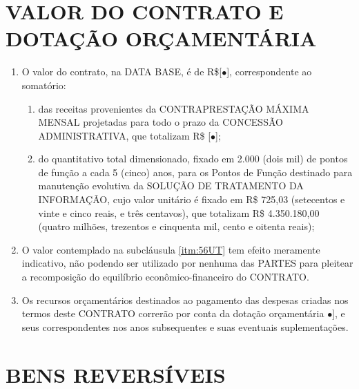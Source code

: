 \documentclass[a4paper,11pt]{report} %
\newcommand{\ValorContrato}{[$\bullet$]}
\newcommand{\ValorTotalCP}{[$\bullet$]}
\newcommand{\DotacaoOrcamentaria}{$\bullet$]}
\begin{document}
\section{VALOR DO CONTRATO E DOTAÇÃO ORÇAMENTÁRIA}
\label{sec:5GLW}

\begin{enumerate}
\item \label{itm:56UT} O valor do contrato, na DATA BASE, é de R\$\ValorContrato, correspondente ao somatório: 

\begin{enumerate}[label*=\arabic*.]
\item \label{itm:3887}	das receitas provenientes da CONTRAPRESTAÇÃO MÁXIMA MENSAL projetadas para todo o prazo da CONCESSÃO ADMINISTRATIVA, que totalizam R\$ \ValorTotalCP;
\item \label{itm:9XEH}	do quantitativo total dimensionado, fixado em 2.000 (dois mil) de pontos de função a cada 5 (cinco) anos, para os Pontos de Função destinado para manutenção evolutiva da SOLUÇÃO DE TRATAMENTO DA INFORMAÇÃO, cujo valor unitário é fixado em R\$ 725,03 (setecentos e vinte e cinco reais, e três centavos), que totalizam R\$ 4.350.180,00 (quatro milhões, trezentos e cinquenta mil, cento e oitenta reais);
\end{enumerate}

\item \label{itm:7ARJ} O valor contemplado na subcláusula \ref{itm:56UT} tem efeito meramente indicativo, não podendo ser utilizado por nenhuma das PARTES para pleitear a recomposição do equilíbrio econômico-financeiro do CONTRATO.
\item \label{itm:UMZE} Os recursos orçamentários destinados ao pagamento das despesas criadas nos termos deste CONTRATO correrão por conta da dotação orçamentária \DotacaoOrcamentaria, e seus correspondentes nos anos subsequentes e suas eventuais suplementações.
\end{enumerate}

\section{BENS REVERSÍVEIS}
\label{sec:YY42}
\end{document}
